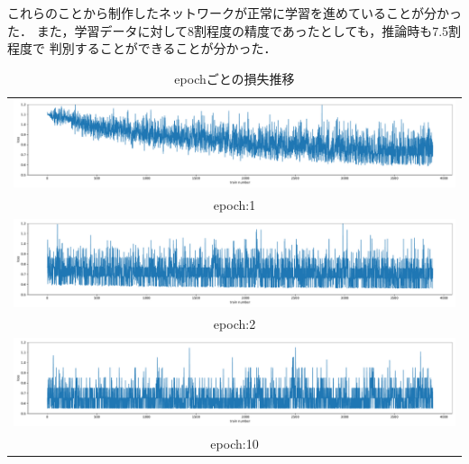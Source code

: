 これらのことから制作したネットワークが正常に学習を進めていることが分かった．
また，学習データに対して8割程度の精度であったとしても，推論時も7.5割程度で
判別することができることが分かった．

\begin{table}[b]
  \begin{center}
    \begin{tabular}{c}
        \includegraphics[width=130mm]{images/net_result/epoch_1.pdf} \\ epoch:1 \\
        \includegraphics[width=130mm]{images/net_result/epoch_2.pdf} \\ epoch:2 \\
        \includegraphics[width=130mm]{images/net_result/epoch_10.pdf} \\ epoch:10 \\
    \end{tabular}
  \end{center}
  \caption{epochごとの損失推移}
  \label{epoch}
\end{table}
\clearpage